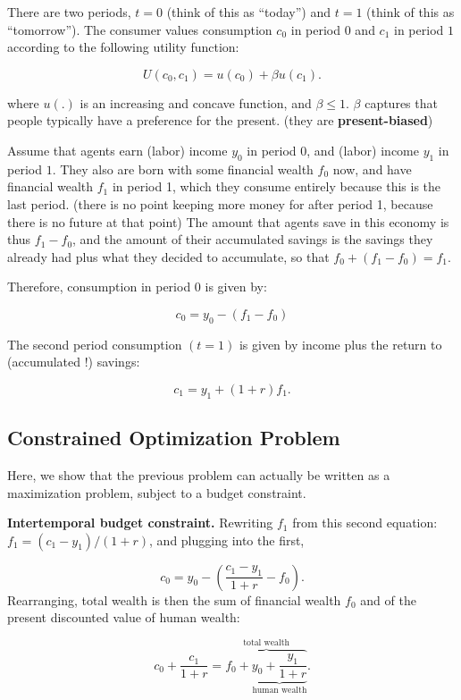\documentclass[]{book}
\theoremstyle{definition}
\theoremstyle{definition}
\theoremstyle{definition}
\theoremstyle{remark}
\begin{document}
There are two periods, \(t=0\) (think of this as ``today'') and \(t=1\)
(think of this as ``tomorrow''). The consumer values consumption \(c_0\)
in period \(0\) and \(c_1\) in period \(1\) according to the following
utility function:

\[U(c_{0},c_{1})=u(c_{0})+\beta u(c_{1}).\]

where \(u(.)\) is an increasing and concave function, and
\(\beta \leq 1\). \(\beta\) captures that people typically have a
preference for the present. (they are \textbf{present-biased})

Assume that agents earn (labor) income \(y_{0}\) in period \(0\), and
(labor) income \(y_{1}\) in period \(1\). They also are born with some
financial wealth \(f_{0}\) now, and have financial wealth \(f_{1}\) in
period 1, which they consume entirely because this is the last period.
(there is no point keeping more money for after period 1, because there
is no future at that point) The amount that agents save in this economy
is thus \(f_{1}-f_{0}\), and the amount of their accumulated savings is
the savings they already had plus what they decided to accumulate, so
that \(f_{0}+(f_{1}-f_{0})=f_{1}.\)

Therefore, consumption in period \(0\) is given by:

\[c_{0} =y_{0}-(f_{1}-f_{0})\]

The second period consumption \((t=1)\) is given by income plus the
return to (accumulated !) savings:

\[c_{1} =y_{1}+(1+r)f_{1}.\]

\subsection{Constrained Optimization
Problem}\label{constrained-optimization-problem}

Here, we show that the previous problem can actually be written as a
maximization problem, subject to a budget constraint.

\textbf{Intertemporal budget constraint.} Rewriting \(f_{1}\) from this
second equation: \(f_{1}=(c_{1}-y_{1})/(1+r)\), and plugging into the
first,

\[c_{0}=y_{0}-\left(\frac{c_{1}-y_{1}}{1+r}-f_{0}\right).\] Rearranging,
total wealth is then the sum of financial wealth \(f_0\) and of the
present discounted value of human wealth:

\[c_{0}+\frac{c_{1}}{1+r}=\overbrace{f_{0}+\underbrace{y_{0}+\frac{y_{1}}{1+r}}_{\text{human wealth}}}^{\text{total wealth}}.\]
\end{document}
